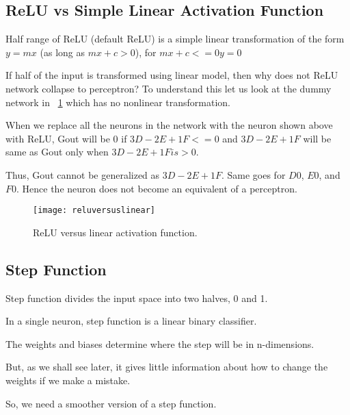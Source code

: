 	\subsection{ReLU vs Simple Linear Activation Function}
	\begin{bulletedlist}
		\item Half range of ReLU (default ReLU) is a simple linear transformation of the form $y = mx$ (as long as $mx +c > 0$),
for $mx + c <=0 y = 0$
		\item If half of the input is transformed using linear model, then why does not ReLU network collapse to perceptron?
To understand this let us look at the dummy network in \figurename~\ref{fig:reluversuslinear} which has no nonlinear transformation.
		\item When we replace all the neurons in the network with the neuron shown above with ReLU, Gout will be 0 if $3D
-2E + 1F < = 0$ and $3D - 2E + 1F$ will be same as Gout only when $3D -2E + 1F is > 0$.
		\item Thus, Gout cannot be generalized as $3D -2E + 1F$. Same goes for $D0$, $E0$, and $F0$. Hence the neuron does not
become an equivalent of a perceptron.
	\end{bulletedlist}

 	\begin{figure}[htb]
		\centering
		\texttt{[image: reluversuslinear]}
		\caption[ReLU versus linear activation function]{ReLU versus linear activation function.}
		\label{fig:reluversuslinear}
	\end{figure}


	\subsection{Step Function}
	\begin{bulletedlist}
		\item Step function divides the input space into two halves, 0 and 1.
		\item In a single neuron, step function is a linear binary classifier.
		\item The weights and biases determine where the step will be in n-dimensions.
		\item But, as we shall see later, it gives little information about how to change the weights if we make a mistake.
		\item So, we need a smoother version of a step function.
	\end{bulletedlist}

